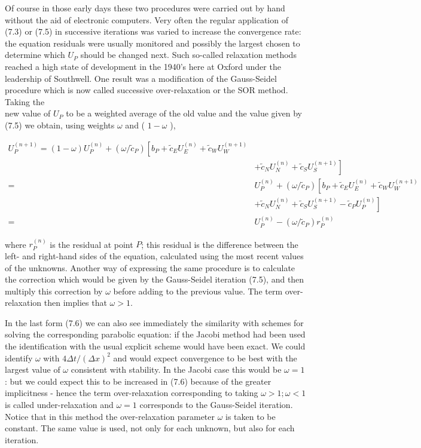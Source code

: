 \documentclass[10pt]{article}
\begin{document}
Of course in those early days these two procedures were carried out by hand without the aid of electronic computers. Very often the regular application of (7.3) or (7.5) in successive iterations was varied to increase the convergence rate: the equation residuals were usually monitored and possibly the largest chosen to determine which \(U_{P}\) should be changed next. Such so-called relaxation methods reached a high state of development in the 1940's here at Oxford under the leadership of Southwell. One result was a modification of the Gauss-Seidel procedure which is now called successive over-relaxation or the SOR method. Taking the\\
new value of \(U_{P}\) to be a weighted average of the old value and the value given by (7.5) we obtain, using weights \(\omega\) and ( \(1-\omega\) ),

\[
\begin{aligned}
U_{P}^{(n+1)}=(1-\omega) U_{P}^{(n)}+\left(\omega / \tilde{c}_{P}\right)\left[b_{P}+\tilde{c}_{E} U_{E}^{(n)}+\tilde{c}_{W} U_{W}^{(n+1)}\right. & \\
& \left.+\tilde{c}_{N} U_{N}^{(n)}+\tilde{c}_{S} U_{S}^{(n+1)}\right] \\
= & U_{P}^{(n)}+\left(\omega / \tilde{c}_{P}\right)\left[b_{P}+\tilde{c}_{E} U_{E}^{(n)}+\tilde{c}_{W} U_{W}^{(n+1)}\right. \\
& \left.+\tilde{c}_{N} U_{N}^{(n)}+\tilde{c}_{S} U_{S}^{(n+1)}-\tilde{c}_{P} U_{P}^{(n)}\right] \\
= & U_{P}^{(n)}-\left(\omega / \tilde{c}_{P}\right) r_{P}^{(n)}
\end{aligned}
\]

where \(r_{P}^{(n)}\) is the residual at point \(P\); this residual is the difference between the left- and right-hand sides of the equation, calculated using the most recent values of the unknowns. Another way of expressing the same procedure is to calculate the correction which would be given by the Gauss-Seidel iteration (7.5), and then multiply this correction by \(\omega\) before adding to the previous value. The term over-relaxation then implies that \(\omega>1\).

In the last form (7.6) we can also see immediately the similarity with schemes for solving the corresponding parabolic equation: if the Jacobi method had been used the identification with the usual explicit scheme would have been exact. We could identify \(\omega\) with \(4 \Delta t /(\Delta x)^{2}\) and would expect convergence to be best with the largest value of \(\omega\) consistent with stability. In the Jacobi case this would be \(\omega=1\) : but we could expect this to be increased in (7.6) because of the greater implicitness - hence the term over-relaxation corresponding to taking \(\omega>1 ; \omega<1\) is called under-relaxation and \(\omega=1\) corresponds to the Gauss-Seidel iteration. Notice that in this method the over-relaxation parameter \(\omega\) is taken to be constant. The same value is used, not only for each unknown, but also for each iteration.
\end{document}
